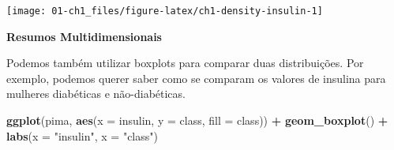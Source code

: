 \documentclass[
]{book}
\newenvironment{Shaded}{\begin{snugshade}}{\end{snugshade}}
\newcommand{\CommentTok}[1]{\textcolor[rgb]{0.56,0.35,0.01}{\textit{#1}}}
\newcommand{\DataTypeTok}[1]{\textcolor[rgb]{0.13,0.29,0.53}{#1}}
\newcommand{\DecValTok}[1]{\textcolor[rgb]{0.00,0.00,0.81}{#1}}
\newcommand{\FloatTok}[1]{\textcolor[rgb]{0.00,0.00,0.81}{#1}}
\newcommand{\KeywordTok}[1]{\textcolor[rgb]{0.13,0.29,0.53}{\textbf{#1}}}
\newcommand{\NormalTok}[1]{#1}
\newcommand{\OperatorTok}[1]{\textcolor[rgb]{0.81,0.36,0.00}{\textbf{#1}}}
\newcommand{\OtherTok}[1]{\textcolor[rgb]{0.56,0.35,0.01}{#1}}
\newcommand{\StringTok}[1]{\textcolor[rgb]{0.31,0.60,0.02}{#1}}
\theoremstyle{definition}
\theoremstyle{definition}
\theoremstyle{definition}
\theoremstyle{remark}
\begin{document}
\begin{Shaded}
\end{Shaded}

\texttt{[image: 01-ch1\_files/figure-latex/ch1-density-insulin-1]}

\textbf{Resumos Multidimensionais}

Podemos também utilizar boxplots para comparar duas distribuições. Por exemplo, podemos querer saber como se comparam os valores de insulina para mulheres diabéticas e não-diabéticas.

\begin{Shaded}
\begin{Highlighting}[]
\KeywordTok{ggplot}\NormalTok{(pima, }\KeywordTok{aes}\NormalTok{(}\DataTypeTok{x =}\NormalTok{ insulin, }\DataTypeTok{y =}\NormalTok{ class, }\DataTypeTok{fill =}\NormalTok{ class)) }\OperatorTok{+}
\StringTok{  }\KeywordTok{geom_boxplot}\NormalTok{() }\OperatorTok{+}
\StringTok{  }\KeywordTok{labs}\NormalTok{(}\DataTypeTok{x =} \StringTok{"insulin"}\NormalTok{, }\DataTypeTok{x =} \StringTok{"class"}\NormalTok{)}
\end{Highlighting}
\end{Shaded}
\end{document}
